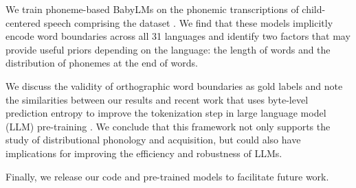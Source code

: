 We train phoneme-based BabyLMs on the phonemic transcriptions of child-centered speech comprising the \ipachildes dataset \citep{goriely2025}. We find that these models implicitly encode word boundaries across all 31 languages and identify two factors that may provide useful priors depending on the language: the length of words and the distribution of phonemes at the end of words. 


We discuss the validity of orthographic word boundaries as gold labels and note the similarities between our results and recent work that uses byte-level prediction entropy to improve the tokenization step in large language model (LLM) pre-training \citep{pagnoni2024byte}. We conclude that this framework not only supports the study of distributional phonology and acquisition, but could also have implications for improving the efficiency and robustness of LLMs.


Finally, we release our code and pre-trained models to facilitate future work.




